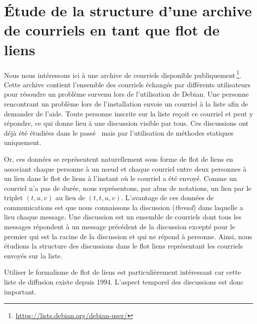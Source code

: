 

\chapter{Étude de la structure d'une archive de courriels en tant que flot de liens}
\minitoc
{}
\label{chap:mailing}


Nous nous intéressons ici à une archive de courriels disponible publiquement\,\footnote{\url{https://lists.debian.org/debian-user/}}.
Cette archive contient l'ensemble des courriels échangés par différents utilisateurs pour résoudre un problème survenu lors de l'utilisation de Debian.
Une personne rencontrant un problème lors de l'installation envoie un courriel à la liste afin de demander de l'aide.
Toute personne inscrite sur la liste reçoit ce courriel et peut y répondre, ce qui donne lieu à une discussion visible par tous.
Ces discussions ont déjà été étudiées dans le passé~\cite{dorat2007,sowe2006,wang2014} mais par l'utilisation de méthodes statiques uniquement.

Or, ces données se représentent naturellement sous forme de flot de liens en associant chaque personne à un n\oe{}ud et chaque courriel entre deux personnes à un lien dans le flot de liens à l'instant où le courriel a été envoyé.
Comme un courriel n'a pas de durée, nous représentons, par abus de notations, un lien par le triplet $(t,u,v)$ au lieu de $(t,t,u,v)$.
L'avantage de ces données de communications est que nous connaissons la discussion (\emph{thread}) dans laquelle a lieu chaque message.
Une discussion est un ensemble de courriels dont tous les messages répondent à un message précédent de la discussion excepté pour le premier qui est la racine de la discussion et qui ne répond à personne.
Ainsi, nous étudions la structure des discussions dans le flot liens représentant les courriels envoyés sur la liste.

Utiliser le formalisme de flot de liens est particulièrement intéressant car cette liste de diffusion existe depuis 1994.
L'aspect temporel des discussions est donc important.



